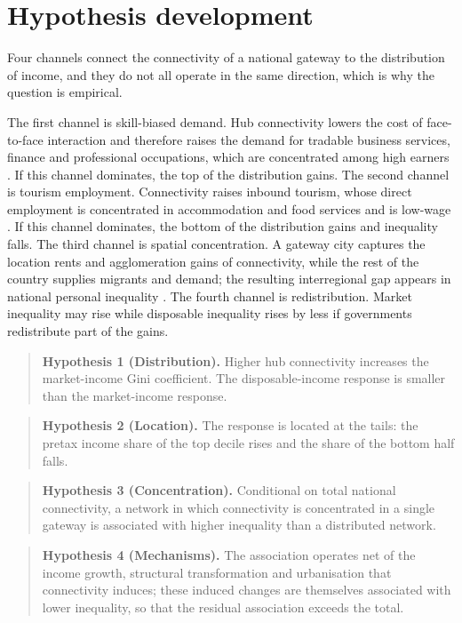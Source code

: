 \documentclass[12pt]{article}
\begin{document}
\section{Hypothesis development}
\label{sec:framework}
Four channels connect the connectivity of a national gateway to the distribution of income, and they do not all operate in the same direction, which is why the question is empirical.

The first channel is skill-biased demand. Hub connectivity lowers the cost of face-to-face interaction and therefore raises the demand for tradable business services, finance and professional occupations, which are concentrated among high earners \citep{Allen_2014,Brueckner_2003}. If this channel dominates, the top of the distribution gains. The second channel is tourism employment. Connectivity raises inbound tourism, whose direct employment is concentrated in accommodation and food services and is low-wage \citep{Khadaroo_2008}. If this channel dominates, the bottom of the distribution gains and inequality falls. The third channel is spatial concentration. A gateway city captures the location rents and agglomeration gains of connectivity, while the rest of the country supplies migrants and demand; the resulting interregional gap appears in national personal inequality \citep{Redding_2004}. The fourth channel is redistribution. Market inequality may rise while disposable inequality rises by less if governments redistribute part of the gains.

\begin{quote}
\textbf{Hypothesis 1 (Distribution).} Higher hub connectivity increases the market-income Gini coefficient. The disposable-income response is smaller than the market-income response.
\end{quote}
\begin{quote}
\textbf{Hypothesis 2 (Location).} The response is located at the tails: the pretax income share of the top decile rises and the share of the bottom half falls.
\end{quote}
\begin{quote}
\textbf{Hypothesis 3 (Concentration).} Conditional on total national connectivity, a network in which connectivity is concentrated in a single gateway is associated with higher inequality than a distributed network.
\end{quote}
\begin{quote}
\textbf{Hypothesis 4 (Mechanisms).} The association operates net of the income growth, structural transformation and urbanisation that connectivity induces; these induced changes are themselves associated with lower inequality, so that the residual association exceeds the total.
\end{quote}
\end{document}
